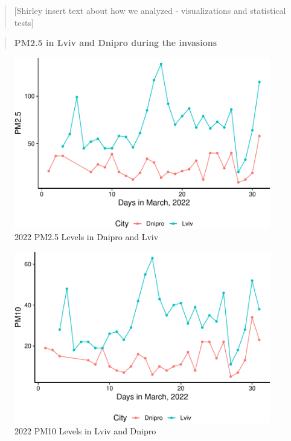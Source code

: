 \documentclass[
  12pt,
]{article}
\begin{document}
\begin{quote}
{[}Shirley insert text about how we analyzed - visualizations and
statistical tests{]}
\end{quote}

\begin{quote}
\textbf{PM2.5 in Lviv and Dnipro during the invasions}
\end{quote}

\begin{figure}
\centering
\includegraphics{Fontanie_Gordon_Weinberg_Project_files/figure-latex/Plotting Lviv vs Dnipro PM25-1.pdf}
\caption{2022 PM2.5 Levels in Dnipro and Lviv}
\end{figure}

\begin{figure}
\centering
\includegraphics{Fontanie_Gordon_Weinberg_Project_files/figure-latex/Plotting Lviv and Dnipro PM10-1.pdf}
\caption{2022 PM10 Levels in Lviv and Dnipro}
\end{figure}
\end{document}

